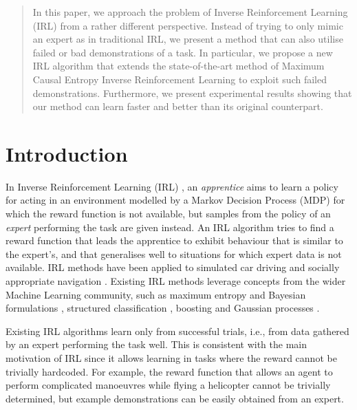 \documentclass[conference]{IEEEtran}
\begin{document}
\begin{abstract}
In this paper, we approach the problem of Inverse Reinforcement Learning (IRL) from a rather different perspective. Instead of trying to only mimic an expert as in traditional IRL, we present a method that can also utilise failed or bad demonstrations of a task. In particular, we propose a new IRL algorithm that extends the state-of-the-art method of Maximum Causal Entropy Inverse Reinforcement Learning to exploit such failed demonstrations. Furthermore, we present experimental results showing that our method can learn faster and better than its original counterpart.
\end{abstract}

\IEEEpeerreviewmaketitle

\section{Introduction}
In Inverse Reinforcement Learning (IRL) \cite{ng2000algorithms}, an \emph{apprentice} aims to learn a policy for acting in an environment modelled by a Markov Decision Process (MDP) for which the reward function is not available, but samples from the policy of an \emph{expert} performing the task are given instead. An IRL algorithm tries to find a reward function that leads the apprentice to exhibit behaviour that is similar to the expert's, and that generalises well to situations for which expert data is not available. %
IRL methods have been applied to simulated car driving \cite{abbeel2004apprenticeship} and socially appropriate navigation \cite{henry2010learning,vasquez2014inverse}. Existing IRL methods leverage concepts from the wider Machine Learning community, such as maximum entropy \cite{ziebart2008maximum} and Bayesian formulations \cite{ramachandran2007bayesian}, structured classification \cite{ratliff2006maximum}, boosting \cite{ratliff2007boosting} and Gaussian processes \cite{levine2011nonlinear}.

Existing IRL algorithms learn only from successful trials, i.e., from data gathered by an expert performing the task well. This is consistent with the main motivation of IRL since it allows learning in tasks where the reward cannot be trivially hardcoded.  For example, the reward function that allows an agent to perform complicated manoeuvres while flying a helicopter cannot be trivially determined, but example demonstrations can be easily obtained from an expert.
\end{document}
